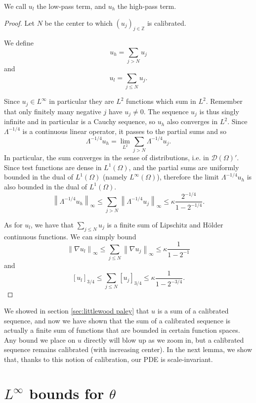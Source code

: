 \documentclass[11pt]{amsart}
\theoremstyle{remark}
\theoremstyle{definition}
\newcommand{\Z}{\mathbb{Z}}
\newcommand{\norm}[1]{\left\lVert#1\right\rVert}
\newcommand{\bracket}[1]{\left[ #1 \right]}
\newcommand{\grad}{\nabla}
\newcommand{\test}{\mathcal{D}}
\newcommand{\ulow}{u_l}
\newcommand{\uhigh}{u_h}
\begin{document}
We call $\ulow$ the low-pass term, and $\uhigh$ the high-pass term.  

\begin{proof}
Let $N$ be the center to which $(u_j)_{j \in \Z}$ is calibrated.  

We define
\[ \uhigh = \sum_{j > N} u_j \]
and 
\[ \ulow = \sum_{j \leq N} u_j. \]

Since $u_j \in L^\infty$ in particular they are $L^2$ functions which sum in $L^2$.  Remember that only finitely many negative $j$ have $u_j \neq 0$.  The sequence $u_j$ is thus singly infinite and in particular is a Cauchy sequence, so $\uhigh$ also converges in $L^2$.  Since $\Lambda^{-1/4}$ is a continuous linear operator, it passes to the partial sums and so
\[ \Lambda^{-1/4} \uhigh = \lim_{L^2} \sum_{j>N} \Lambda^{-1/4} u_j. \]
In particular, the sum converges in the sense of distributions, i.e. in $\test(\Omega)'$.  Since test functions are dense in $L^1(\Omega)$, and the partial sums are uniformly bounded in the dual of $L^1(\Omega)$ (namely $L^\infty(\Omega)$), therefore the limit $\Lambda^{-1/4} \uhigh$ is also bounded in the dual of $L^1(\Omega)$.  
\[ \norm{\Lambda^{-1/4} \uhigh}_\infty \leq \sum_{j>N} \norm{\Lambda^{-1/4} u_j}_\infty \leq \kappa \frac{2^{-1/4}}{1-2^{-1/4}}. \]

As for $\ulow$, we have that $\sum_{j \leq N} u_j$ is a finite sum of Lipschitz and H\"{o}lder continuous functions.  We can simply bound
\[ \norm{\grad \ulow}_\infty \leq \sum_{j \leq N} \norm{\grad u_j}_\infty \leq \kappa \frac{1}{1 - 2^{-1}} \]
and
\[ \bracket{\ulow}_{3/4} \leq \sum_{j \leq N} \bracket{u_j}_{3/4} \leq \kappa \frac{1}{1 - 2^{-3/4}}. \]
\end{proof}

We showed in section \ref{sec:littlewood paley} that $u$ is a sum of a calibrated sequence, and now we have shown that the sum of a calibrated sequence is actually a finite sum of functions that are bounded in certain function spaces.  Any bound we place on $u$ directly will blow up as we zoom in, but a calibrated sequence remains calibrated (with increasing center).  In the next lemma, we show that, thanks to this notion of calibration, our PDE is scale-invariant.  





\section{$L^\infty$ bounds for $\theta$} \label{sec:Linfty}
\end{document}
